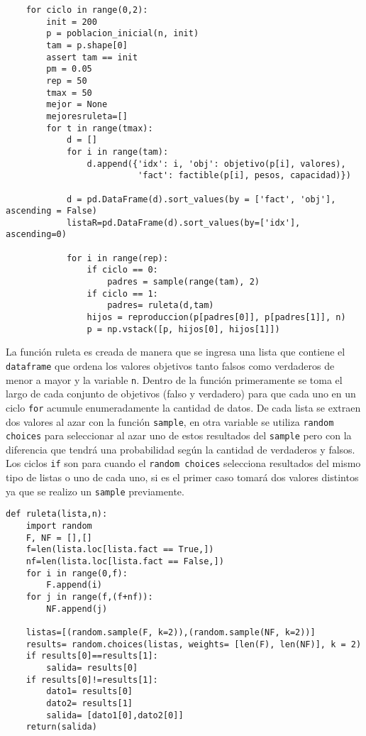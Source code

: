 \documentclass[a4paper, 11pt]{article}
\begin{document}
\begin{verbatim}
    for ciclo in range(0,2): 
        init = 200
        p = poblacion_inicial(n, init)
        tam = p.shape[0]
        assert tam == init
        pm = 0.05
        rep = 50
        tmax = 50
        mejor = None
        mejoresruleta=[]
        for t in range(tmax):
            d = []
            for i in range(tam):
                d.append({'idx': i, 'obj': objetivo(p[i], valores),
                          'fact': factible(p[i], pesos, capacidad)})

            d = pd.DataFrame(d).sort_values(by = ['fact', 'obj'], ascending = False)
            listaR=pd.DataFrame(d).sort_values(by=['idx'], ascending=0)
    
            for i in range(rep):  
                if ciclo == 0:
                    padres = sample(range(tam), 2)
                if ciclo == 1:
                    padres= ruleta(d,tam)
                hijos = reproduccion(p[padres[0]], p[padres[1]], n)
                p = np.vstack([p, hijos[0], hijos[1]])
\end{verbatim}

La función ruleta es creada de manera que se ingresa una lista que contiene el \texttt{dataframe} que ordena los valores objetivos tanto falsos como verdaderos de menor a mayor y la variable \texttt{n}. Dentro de la función primeramente se toma el largo de cada conjunto de objetivos (falso y verdadero) para que cada uno en un ciclo \texttt{for} acumule enumeradamente la cantidad de datos. De cada lista se extraen dos valores al azar con la función \texttt{sample}, en otra variable se utiliza \texttt{random choices} para seleccionar al azar uno de estos resultados del \texttt{sample} pero con la diferencia que tendrá una probabilidad según la cantidad de verdaderos y falsos. Los ciclos \texttt{if} son para cuando el \texttt{random choices} selecciona resultados del mismo tipo de listas o uno de cada uno, si es el primer caso tomará dos valores distintos ya que se realizo un \texttt{sample} previamente.
\begin{verbatim}
def ruleta(lista,n):
    import random
    F, NF = [],[]
    f=len(lista.loc[lista.fact == True,])
    nf=len(lista.loc[lista.fact == False,])
    for i in range(0,f):
        F.append(i)
    for j in range(f,(f+nf)):
        NF.append(j)

    listas=[(random.sample(F, k=2)),(random.sample(NF, k=2))]
    results= random.choices(listas, weights= [len(F), len(NF)], k = 2)
    if results[0]==results[1]:
        salida= results[0]
    if results[0]!=results[1]:
        dato1= results[0]
        dato2= results[1]
        salida= [dato1[0],dato2[0]]
    return(salida)
\end{verbatim}
\end{document}

